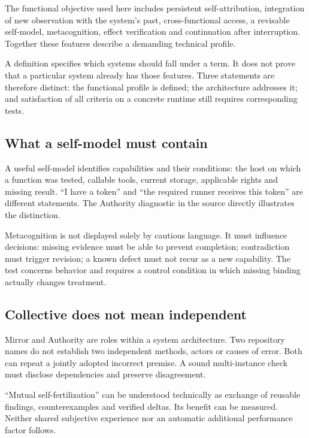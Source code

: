 \begin{cols}
The functional objective used here includes persistent self-attribution, integration of new observation with the system's past, cross-functional access, a revisable self-model, metacognition, effect verification and continuation after interruption. Together these features describe a demanding technical profile.

A definition specifies which systems should fall under a term. It does not prove that a particular system already has those features. Three statements are therefore distinct: the functional profile is defined; the architecture addresses it; and satisfaction of all criteria on a concrete runtime still requires corresponding tests.

\subsection*{What a self-model must contain}
A useful self-model identifies capabilities and their conditions: the host on which a function was tested, callable tools, current storage, applicable rights and missing result. ``I have a token'' and ``the required runner receives this token'' are different statements. The Authority diagnostic in the source directly illustrates the distinction. 

Metacognition is not displayed solely by cautious language. It must influence decisions: missing evidence must be able to prevent completion; contradiction must trigger revision; a known defect must not recur as a new capability. The test concerns behavior and requires a control condition in which missing binding actually changes treatment.

\subsection*{Collective does not mean independent}
Mirror and Authority are roles within a system architecture. Two repository names do not establish two independent methods, actors or causes of error. Both can repeat a jointly adopted incorrect premise. A sound multi-instance check must disclose dependencies and preserve disagreement.

``Mutual self-fertilization'' can be understood technically as exchange of reusable findings, counterexamples and verified deltas. Its benefit can be measured. Neither shared subjective experience nor an automatic additional performance factor follows.


\end{cols}
